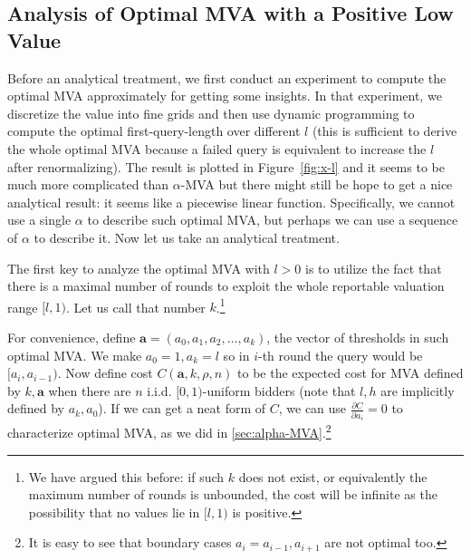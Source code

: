 \subsection{Analysis of Optimal MVA with a Positive Low Value}\label{sec:general_analysis}

Before an analytical treatment, we first conduct an experiment to compute the
optimal MVA approximately for getting some insights. In that experiment, we
discretize the value into fine grids and then use dynamic programming to
compute the optimal first-query-length over different $l$ (this is sufficient to derive the whole
optimal MVA because a failed query is equivalent to increase the $l$ after
renormalizing). The result is plotted in Figure~\ref{fig:x-l}
and it seems to be much more complicated than $\alpha$-MVA but there might
still be hope to get a nice analytical result: it seems like a piecewise linear
function. Specifically, we cannot use a single $\alpha$ to describe such
optimal MVA, but perhaps we can use a sequence of $\alpha$ to describe it. Now
let us take an analytical treatment.


The first key to analyze the optimal MVA with $l > 0$ is to utilize
the fact that there is a maximal number of rounds to exploit the whole
reportable valuation range $[l, 1)$. Let us call that
number $k$.\footnote{We have argued this before: if such $k$ does not exist, or equivalently
the maximum number of rounds is unbounded, the cost will be infinite as the possibility that no
values lie in $[l, 1)$ is positive.}

For convenience, define $\boldsymbol a = (a_0, a_1, a_2, \ldots, a_k)$, the vector of
thresholds in such optimal MVA. We make $a_0 = 1, a_k = l$ so in $i$-th
round the query would be $[a_i, a_{i-1})$. Now define cost $C(\boldsymbol a, k, \rho,
n)$ to be the expected cost for MVA defined by $k, \boldsymbol a$ when there are $n$
i.i.d.  $[0, 1)$-uniform bidders (note that $l, h$ are implicitly defined by
$a_k, a_0$). If we can get a neat form of $C$, we can use $\frac{\partial
C}{\partial a_i} = 0 $ to characterize optimal MVA, as we did in 
\ref{sec:alpha-MVA}.\footnote{It is easy to see that boundary cases $a_i = a_{i-1},
a_{i+1}$ are not optimal too.}


